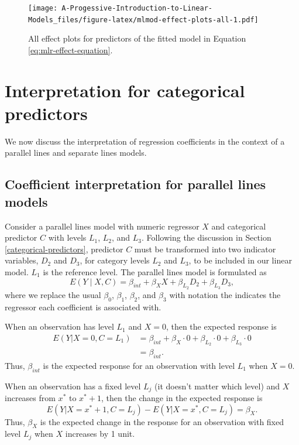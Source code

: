\documentclass[
]{book}
\theoremstyle{definition}
\theoremstyle{definition}
\theoremstyle{definition}
\theoremstyle{definition}
\theoremstyle{remark}
\begin{document}
\begin{figure}
\centering
\texttt{[image: A-Progessive-Introduction-to-Linear-Models\_files/figure-latex/mlmod-effect-plots-all-1.pdf]}
\caption{\label{fig:mlmod-effect-plots-all}All effect plots for predictors of the fitted model in Equation \eqref{eq:mlr-effect-equation}.}
\end{figure}

\hypertarget{interp-cat-predictor}{%
\section{Interpretation for categorical predictors}\label{interp-cat-predictor}}

We now discuss the interpretation of regression coefficients in the
context of a parallel lines and separate lines models.

\hypertarget{pl-interp}{%
\subsection{Coefficient interpretation for parallel lines models}\label{pl-interp}}

Consider a parallel lines model with numeric regressor \(X\) and
categorical predictor \(C\) with levels \(L_1\), \(L_2\), and \(L_3\). Following
the discussion in Section \ref{categorical-predictors}, predictor \(C\)
must be transformed into two indicator variables, \(D_2\) and \(D_3\), for
category levels \(L_2\) and \(L_3\), to be included in our linear model.
\(L_1\) is the reference level. The parallel lines model is formulated as
\[
E(Y \mid X, C) = \beta_{int} + \beta_{X} X + \beta_{L_2} D_2 +  \beta_{L_3} D_3, \label{eq:pl-def-interp}
\] where we replace the usual \(\beta_0\), \(\beta_1\), \(\beta_2\), and
\(\beta_3\) with notation the indicates the regressor each coefficient is
associated with.

When an observation has level \(L_1\) and \(X=0\), then the expected
response is \[
\begin{aligned}
E(Y|X = 0, C=L_1) &= \beta_{int} + \beta_X \cdot 0 + \beta_{L_2} \cdot 0 + \beta_{L_3} \cdot 0 \\
&= \beta_{int}.
\end{aligned}
\] Thus, \(\beta_{int}\) is the expected response for an observation with
level \(L_1\) when \(X=0\).

When an observation has a fixed level \(L_j\) (it doesn't matter which
level) and \(X\) increases from \(x^*\) to \(x^*+1\), then the change in the
expected response is \[
E(Y|X = x^* + 1, C=L_j) - E(Y|X = x^*, C=L_j)= \beta_X.
\] Thus, \(\beta_X\) is the expected change in the response for an
observation with fixed level \(L_j\) when \(X\) increases by 1 unit.
\end{document}
